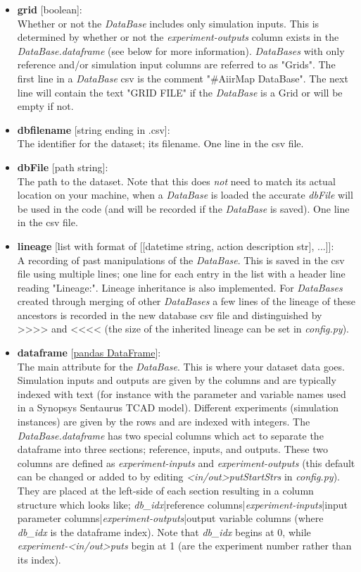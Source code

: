 \documentclass[a4paper,12pt,english]{article}
\begin{document}
    \begin{itemize}
    \item \textbf{grid} [boolean]:\\
    Whether or not the \textit{DataBase} includes only simulation inputs. This is determined by whether or not the \textit{experiment-outputs} column exists in the \textit{DataBase.dataframe} (see below for more information). \textit{DataBases} with only reference and/or simulation input columns are referred to as "Grids". The first line in a \textit{DataBase} csv is the comment "\#AiirMap DataBase". The next line will contain the text "GRID FILE" if the \textit{DataBase} is a Grid or will be empty if not.  
    \item \textbf{dbfilename} [string ending in .csv]:\\
    The identifier for the dataset; its filename. One line in the csv file.
    \item \textbf{dbFile} [path string]:\\
    The path to the dataset. Note that this does \textit{not} need to match its actual location on your machine, when a \textit{DataBase} is loaded the accurate \textit{dbFile} will be used in the code (and will be recorded if the \textit{DataBase} is saved). One line in the csv file.
    \item \textbf{lineage} [list with format of [[datetime string, action description str], ...]]:\\
    A recording of past manipulations of the \textit{DataBase}. This is saved in the csv file using multiple lines; one line for each entry in the list with a header line reading "Lineage:". Lineage inheritance is also implemented. For \textit{DataBases} created through merging of other \textit{DataBases} a few lines of the lineage of these ancestors is recorded in the new database csv file and distinguished by >>>> and <<<< (the size of the inherited lineage can be set in \textit{config.py}). 
    \item \textbf{dataframe} [\href{https://pandas.pydata.org/docs/reference/api/pandas.DataFrame.html}{pandas DataFrame}]:\\
    The main attribute for the \textit{DataBase}. This is where your dataset data goes. Simulation inputs and outputs are given by the columns and are typically indexed with text (for instance with the parameter and variable names used in a Synopsys Sentaurus TCAD model). Different experiments (simulation instances) are given by the rows and are indexed with integers. The \textit{DataBase.dataframe} has two special columns which act to separate the dataframe into three sections; reference, inputs, and outputs. These two columns are defined as \textit{experiment-inputs} and \textit{experiment-outputs} (this default can be changed or added to by editing \textit{<in/out>putStartStrs} in \textit{config.py}). They are placed at the left-side of each section resulting in a column structure which looks like; \textit{db\_idx}|reference columns|\textit{experiment-inputs}|input parameter columns|\textit{experiment-outputs}|output variable columns (where \textit{db\_idx} is the dataframe index). Note that \textit{db\_idx} begins at 0, while \textit{experiment-<in/out>puts} begin at 1 (are the experiment number rather than its index).

\end{itemize}
\end{document}
